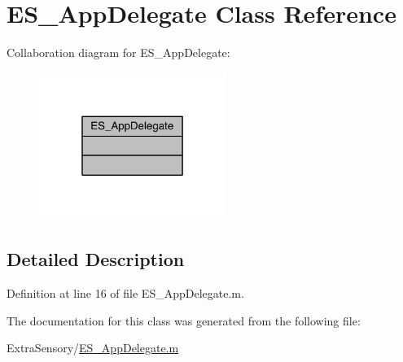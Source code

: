 \hypertarget{class_e_s___app_delegate}{\section{E\+S\+\_\+\+App\+Delegate Class Reference}
\label{class_e_s___app_delegate}
}


Collaboration diagram for E\+S\+\_\+\+App\+Delegate\+:\nopagebreak
\begin{figure}[H]
\begin{center}
\leavevmode
\includegraphics[width=172pt]{d5/d34/class_e_s___app_delegate__coll__graph}
\end{center}
\end{figure}


\subsection{Detailed Description}


Definition at line 16 of file E\+S\+\_\+\+App\+Delegate.\+m.



The documentation for this class was generated from the following file\+:\begin{DoxyCompactItemize}
\item 
Extra\+Sensory/\hyperlink{_e_s___app_delegate_8m}{E\+S\+\_\+\+App\+Delegate.\+m}\end{DoxyCompactItemize}
